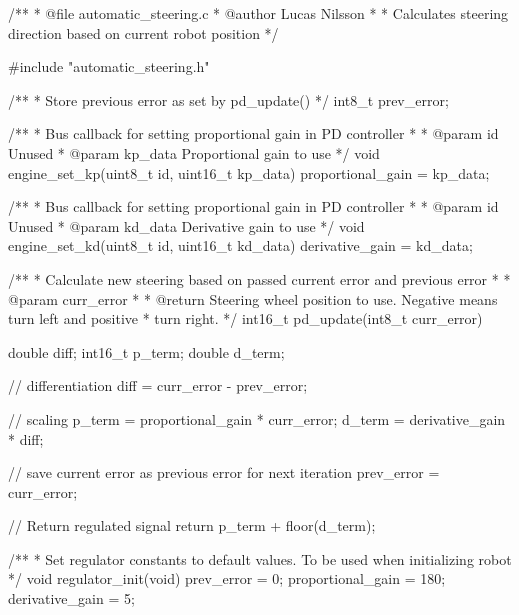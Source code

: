 \begin{listing}{1}
/**
 *	@file automatic_steering.c
 *	@author Lucas Nilsson
 *
 *	Calculates steering direction based on current robot position
 */

#include "automatic_steering.h"

/**
 *	Store previous error as set by pd_update()
 */
int8_t prev_error;

/**
 *	Bus callback for setting proportional gain in PD controller
 *
 *	@param id Unused
 *	@param kp_data Proportional gain to use
 */
void engine_set_kp(uint8_t id, uint16_t kp_data)
{
	proportional_gain = kp_data;
}

/**
 *	Bus callback for setting proportional gain in PD controller
 *
 *	@param id Unused
 *	@param kd_data Derivative gain to use
 */
void engine_set_kd(uint8_t id, uint16_t kd_data)
{
	derivative_gain = kd_data;
}

/**
 *	Calculate new steering based on passed current error and
 previous error
 *
 *	@param curr_error
 *
 *	@return Steering wheel position to use. Negative means turn
 left and positive
 *	        turn right.
 */
int16_t pd_update(int8_t curr_error)
{
	double diff;
	int16_t p_term;
	double d_term;

	// differentiation
	diff = curr_error - prev_error;

	// scaling
	p_term = proportional_gain * curr_error;
	d_term = derivative_gain  * diff;

	// save current error as previous error for next iteration
	prev_error = curr_error;

	// Return regulated signal
	return p_term + floor(d_term);
}

/**
 *	Set regulator constants to default values. To be used when
 initializing robot
 */
void regulator_init(void)
{
	prev_error = 0;
	proportional_gain = 180;
	derivative_gain = 5;
}
\end{listing}
